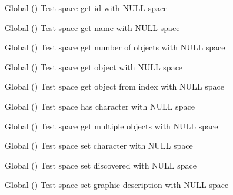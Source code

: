 \begin{DoxyRefList}
\item[Global \doxylink{space__test_8c_af9087176b0d3c41d83a17a4918b13e31}{test2\+\_\+space\+\_\+get\+\_\+id} ()]\label{test__test000137}%
%
Test space get id with NULL space  
\item[Global \doxylink{space__test_8c_aee88ed31c63efc674051a4563aed86e2}{test2\+\_\+space\+\_\+get\+\_\+name} ()]\label{test__test000139}%
%
Test space get name with NULL space  
\item[Global \doxylink{space__test_8c_a0b036973034eb7e3ff71ad43dcdea0a3}{test2\+\_\+space\+\_\+get\+\_\+num\+\_\+objects} ()]\label{test__test000156}%
%
Test space get number of objects with NULL space  
\item[Global \doxylink{space__test_8h_a0fe857c34f691aaba197d03315c3955f}{test2\+\_\+space\+\_\+get\+\_\+object} ()]\label{test__test000141}%
%
Test space get object with NULL space  
\item[Global \doxylink{space__test_8c_a68376dad775343380755a49fc53bc8ad}{test2\+\_\+space\+\_\+get\+\_\+object\+\_\+from\+\_\+index} ()]\label{test__test000154}%
%
Test space get object from index with NULL space  
\item[Global \doxylink{space__test_8c_a1cbe7dcf6e64da12172acc79abbd3f65}{test2\+\_\+space\+\_\+has\+\_\+character} ()]\label{test__test000162}%
%
Test space has character with NULL space  
\item[Global \doxylink{space__test_8c_a4c5deb606df6b7b0bd886069628a35e4}{test2\+\_\+space\+\_\+multiple\+\_\+objects} ()]\label{test__test000143}%
%
Test space get multiple objects with NULL space  
\item[Global \doxylink{space__test_8c_a8e7d3726a7551c0de5825cc882836a71}{test2\+\_\+space\+\_\+set\+\_\+character} ()]\label{test__test000160}%
%
Test space set character with NULL space  
\item[Global \doxylink{space__test_8c_a997b53a481b02485dd54c9cbce83465a}{test2\+\_\+space\+\_\+set\+\_\+discovered} ()]\label{test__test000148}%
%
Test space set discovered with NULL space  
\item[Global \doxylink{space__test_8c_af40c7a664b529a39c3d98dca3d0af708}{test2\+\_\+space\+\_\+set\+\_\+gdesc} ()]\label{test__test000146}%
%
Test space set graphic description with NULL space  

\end{DoxyRefList}

